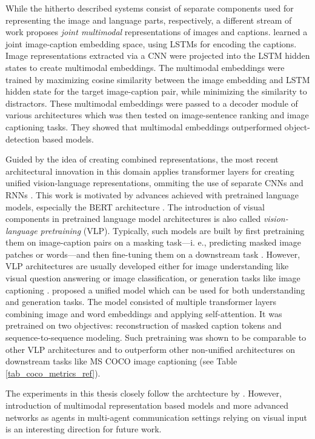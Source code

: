 While the hitherto described systems consist of separate components used for representing the image and language parts, respectively, a different stream of work proposes \textit{joint multimodal} representations of images and captions. \cite{kiros2014unifying} learned a joint image-caption embedding space, using LSTMs for encoding the captions. Image representations extracted via a CNN were projected into the LSTM hidden states to create multimodal embeddings. The multimodal embeddings were trained by maximizing cosine similarity between the image embedding and LSTM hidden state for the target image-caption pair, while minimizing the similarity to distractors. These multimodal embeddings were passed to a decoder module of various architectures which was then tested on image-sentence ranking and image captioning tasks. They showed that multimodal embeddings outperformed object-detection based models.

Guided by the idea of creating combined representations, the most recent architectural innovation in this domain applies transformer layers for creating unified vision-language representations, ommiting the use of separate CNNs and RNNs \parencite{vaswani2017attention, zhou2019unified}. This work is motivated by advances achieved with pretrained language models, especially the BERT architecture \parencite{devlin2018bert}. The introduction of visual components in pretrained language model architectures is also called \textit{vision-language pretraining} (VLP). Typically, such models are built by first pretraining them on image-caption pairs on a masking task---i. e., predicting masked image patches or words---and then fine-tuning them on a downstream task \parencite[e.~g.,][]{lu2019vilbert}.
However, VLP architectures are usually developed either for image understanding like visual question answering or image classification, or generation tasks like image captioning \parencite{zhou2019unified}. 
\cite{zhou2019unified} proposed a unified model which can be used for both understanding and generation tasks. 
The model consisted of multiple transformer layers combining image and word embeddings and applying self-attention. It was pretrained on two objectives: reconstruction of masked caption tokens and sequence-to-sequence modeling. Such pretraining was shown to be comparable to other VLP architectures and to outperform other non-unified architectures on downstream tasks like MS COCO image captioning (see Table \ref{tab_coco_metrics_ref}). 

The experiments in this thesis closely follow the archtecture by \cite{vinyals2015show}. However, introduction of multimodal representation based models and more advanced networks as agents in multi-agent communication settings relying on visual input is an interesting direction for future work. 

